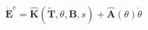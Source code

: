 \documentclass[preview]{standalone}
\begin{document}
\begin{align*}
\dot{\mathbf{E}}^e = \hat{\mathbf{K}}(\tilde{\mathbf{T}},\theta,\mathbf{B},s) + \hat{\mathbf{A}}(\theta)\dot{\theta}
\end{align*}
\end{document}
